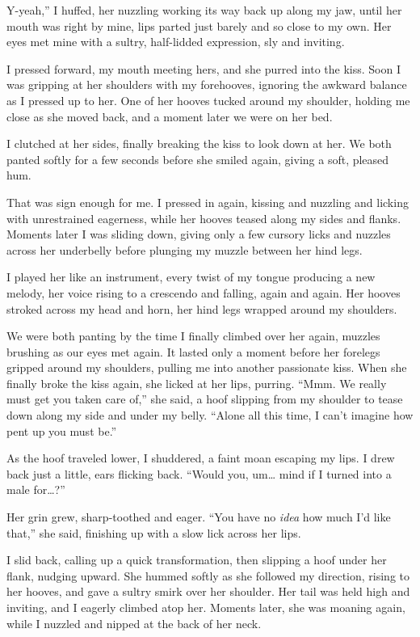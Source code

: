\leavevmode{}Y-yeah,” I huffed, her nuzzling working its way back up along my jaw, until her mouth was right by mine, lips parted just barely and so close to my own. Her eyes met mine with a sultry, half-lidded expression, sly and inviting.

I pressed forward, my mouth meeting hers, and she purred into the kiss. Soon I was gripping at her shoulders with my forehooves, ignoring the awkward balance as I pressed up to her. One of her hooves tucked around my shoulder, holding me close as she moved back, and a moment later we were on her bed.

I clutched at her sides, finally breaking the kiss to look down at her. We both panted softly for a few seconds before she smiled again, giving a soft, pleased hum.

That was sign enough for me. I pressed in again, kissing and nuzzling and licking with unrestrained eagerness, while her hooves teased along my sides and flanks. Moments later I was sliding down, giving only a few cursory licks and nuzzles across her underbelly before plunging my muzzle between her hind legs.

I played her like an instrument, every twist of my tongue producing a new melody, her voice rising to a crescendo and falling, again and again. Her hooves stroked across my head and horn, her hind legs wrapped around my shoulders.

We were both panting by the time I finally climbed over her again, muzzles brushing as our eyes met again. It lasted only a moment before her forelegs gripped around my shoulders, pulling me into another passionate kiss. When she finally broke the kiss again, she licked at her lips, purring. “Mmm. We really must get you taken care of,” she said, a hoof slipping from my shoulder to tease down along my side and under my belly. “Alone all this time, I can’t imagine how pent up you must be.”

As the hoof traveled lower, I shuddered, a faint moan escaping my lips. I drew back just a little, ears flicking back. “Would you, um… mind if I turned into a male for…?”

Her grin grew, sharp-toothed and eager. “You have no \textit{idea} how much I’d like that,” she said, finishing up with a slow lick across her lips.

I slid back, calling up a quick transformation, then slipping a hoof under her flank, nudging upward. She hummed softly as she followed my direction, rising to her hooves, and gave a sultry smirk over her shoulder. Her tail was held high and inviting, and I eagerly climbed atop her. Moments later, she was moaning again, while I nuzzled and nipped at the back of her neck.

